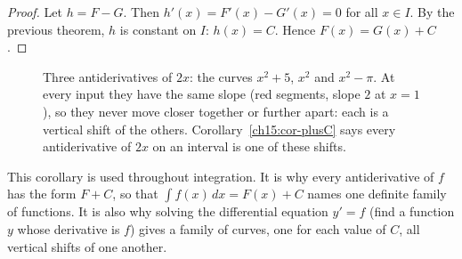 \begin{proof}
Let $h=F-G$. Then $h'(x)=F'(x)-G'(x)=0$ for all $x\in I$. By the previous theorem,
$h$ is constant on $I$: $h(x)=C$. Hence $F(x)=G(x)+C$.
\end{proof}

\begin{figure}[htbp]
\centering
{}
\caption{Three antiderivatives of $2x$: the curves $x^2+5$, $x^2$ and $x^2-\pi$. At
every input they have the same slope (red segments, slope $2$ at $x=1$), so they never
move closer together or further apart: each is a vertical shift of the others.
Corollary~\ref{ch15:cor-plusC} says every antiderivative of $2x$ on an interval is one
of these shifts.}
\label{ch15:fig-family}
\end{figure}

\begin{aestheticbox}
This corollary is used throughout integration. It is why every antiderivative of
$f$ has the form $F+C$, so that $\int f(x)\,dx = F(x)+C$ names one definite family of
functions. It is also why solving the differential equation $y'=f$ (find a function
$y$ whose derivative is $f$) gives a family of curves, one for each value of $C$, all
vertical shifts of one another.
\end{aestheticbox}

